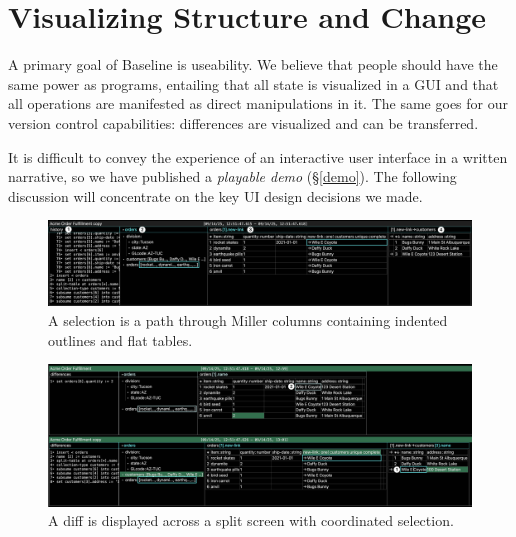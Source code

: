 \documentclass[english,submission]{programming}
\theoremstyle{definition}
\begin{document}





\section{Visualizing Structure and Change}\label{GUI}

A primary goal of Baseline is useability. We believe that people should have the same power as programs, entailing that all state is visualized in a GUI and that all operations are manifested as direct manipulations in it. The same goes for our version control capabilities: differences are visualized and can be transferred.

It is difficult to convey the experience of an interactive user interface in a written narrative, so we have published a \textit{playable demo} (\S\ref{demo}). The following discussion will concentrate on the key UI design decisions we made.

\begin{figure}
\includegraphics[width=\textwidth]{GUInumbered.png}
\caption{A selection is a path through Miller columns containing indented outlines and flat tables.}
\label{fig:GUI}
\end{figure}

\begin{figure}
\includegraphics[width=\textwidth]{DiffNumbered.png}
\caption{A diff is displayed across a split screen with coordinated selection.}
\label{fig:Diff}
\end{figure}
\end{document}
